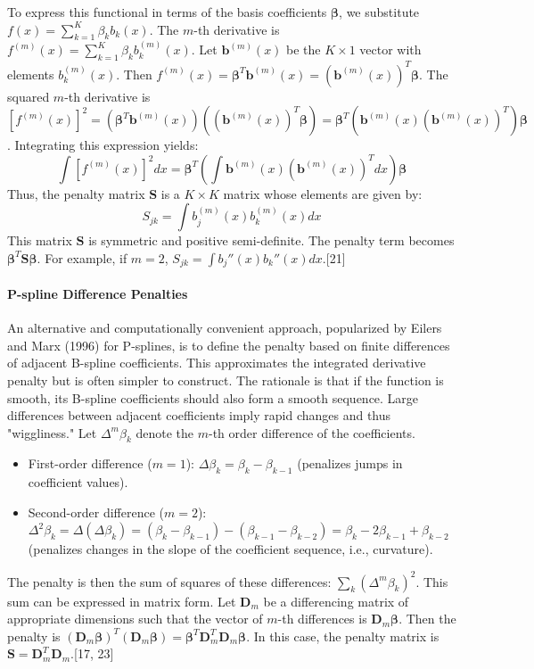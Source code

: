 \documentclass[11pt, a4paper]{article}
\begin{document}
To express this functional in terms of the basis coefficients $\boldsymbol{\beta}$, we substitute $f(x) = \sum_{k=1}^{K} \beta_k b_k(x)$. The $m$-th derivative is $f^{(m)}(x) = \sum_{k=1}^{K} \beta_k b_k^{(m)}(x)$. Let $\mathbf{b}^{(m)}(x)$ be the $K \times 1$ vector with elements $b_k^{(m)}(x)$. Then $f^{(m)}(x) = \boldsymbol{\beta}^T \mathbf{b}^{(m)}(x) = (\mathbf{b}^{(m)}(x))^T \boldsymbol{\beta}$.
The squared $m$-th derivative is $[f^{(m)}(x)]^2 = (\boldsymbol{\beta}^T \mathbf{b}^{(m)}(x)) ((\mathbf{b}^{(m)}(x))^T \boldsymbol{\beta}) = \boldsymbol{\beta}^T \left( \mathbf{b}^{(m)}(x) (\mathbf{b}^{(m)}(x))^T \right) \boldsymbol{\beta}$.
Integrating this expression yields:
\[ \int [f^{(m)}(x)]^2 dx = \boldsymbol{\beta}^T \left( \int \mathbf{b}^{(m)}(x) (\mathbf{b}^{(m)}(x))^T dx \right) \boldsymbol{\beta} \]
Thus, the penalty matrix $\mathbf{S}$ is a $K \times K$ matrix whose elements are given by:
\[ S_{jk} = \int b_j^{(m)}(x) b_k^{(m)}(x) dx \]
This matrix $\mathbf{S}$ is symmetric and positive semi-definite. The penalty term becomes $\boldsymbol{\beta}^T \mathbf{S} \boldsymbol{\beta}$. For example, if $m=2$, $S_{jk} = \int b_j''(x) b_k''(x) dx$.[21]

\paragraph{P-spline Difference Penalties}
An alternative and computationally convenient approach, popularized by Eilers and Marx (1996) for P-splines, is to define the penalty based on finite differences of adjacent B-spline coefficients. This approximates the integrated derivative penalty but is often simpler to construct.
The rationale is that if the function is smooth, its B-spline coefficients should also form a smooth sequence. Large differences between adjacent coefficients imply rapid changes and thus "wiggliness."
Let $\Delta^m \beta_k$ denote the $m$-th order difference of the coefficients.
\begin{itemize}
 \item First-order difference ($m=1$): $\Delta \beta_k = \beta_k - \beta_{k-1}$ (penalizes jumps in coefficient values).
 \item Second-order difference ($m=2$): $\Delta^2 \beta_k = \Delta(\Delta \beta_k) = (\beta_k - \beta_{k-1}) - (\beta_{k-1} - \beta_{k-2}) = \beta_k - 2\beta_{k-1} + \beta_{k-2}$ (penalizes changes in the slope of the coefficient sequence, i.e., curvature).
\end{itemize}
The penalty is then the sum of squares of these differences: $\sum_{k} (\Delta^m \beta_k)^2$.
This sum can be expressed in matrix form. Let $\mathbf{D}_m$ be a differencing matrix of appropriate dimensions such that the vector of $m$-th differences is $\mathbf{D}_m \boldsymbol{\beta}$. Then the penalty is $(\mathbf{D}_m \boldsymbol{\beta})^T (\mathbf{D}_m \boldsymbol{\beta}) = \boldsymbol{\beta}^T \mathbf{D}_m^T \mathbf{D}_m \boldsymbol{\beta}$.
In this case, the penalty matrix is $\mathbf{S} = \mathbf{D}_m^T \mathbf{D}_m$.[17, 23]
\end{document}
